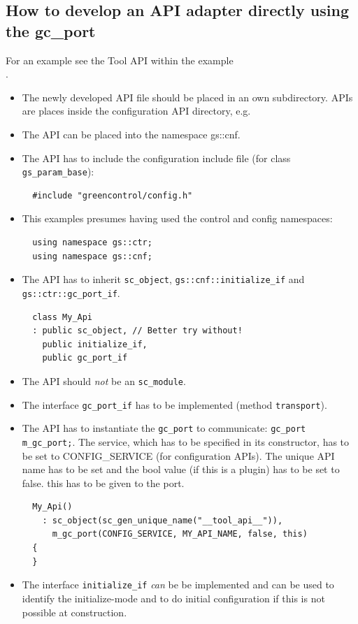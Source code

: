 \subsection{How to develop an API adapter directly using the gc\_port}
For an example see the Tool API within the \GreenControl example \\
.

\begin{itemize}
	\item The newly developed API file should be placed in an own subdirectory. \GreenConfig APIs are places inside the configuration API directory, e.g. 
	\item The API can be placed into the namespace {\sffamily gs::cnf}.
	\item The API has to include the configuration include file (for class \lstinline|gs_param_base|):
\begin{lstlisting}
  #include "greencontrol/config.h"
\end{lstlisting}

    \item This examples presumes having used the control and config namespaces:
\begin{lstlisting}
  using namespace gs::ctr;
  using namespace gs::cnf;
\end{lstlisting}

	\item The API has to inherit \lstinline|sc_object|, \lstinline|gs::cnf::initialize_if| and \mbox{\lstinline|gs::ctr::gc_port_if|.}
\begin{lstlisting}
  class My_Api
  : public sc_object, // Better try without!
    public initialize_if,
    public gc_port_if
\end{lstlisting}

	\item The API should {\em not} be an \lstinline|sc_module|.

	\item The interface \lstinline|gc_port_if| has to be implemented (method \lstinline|transport|).

	\item The API has to instantiate the \lstinline|gc_port| to communicate: \mbox{\lstinline|gc_port m_gc_port;|.} The service, which has to be specified in its constructor, has to be set to {\sffamily CONFIG\_SERVICE} (for configuration APIs). The unique API name has to be set and the bool value (if this is a plugin) has to be set to {\sffamily false}. {\sffamily this} has to be given to the port.
\begin{lstlisting}
  My_Api()
    : sc_object(sc_gen_unique_name("__tool_api__")),
      m_gc_port(CONFIG_SERVICE, MY_API_NAME, false, this)
  {
  }
\end{lstlisting}

	\item The interface \lstinline|initialize_if| \emph{can} be be implemented and can be used to identify the initialize-mode and to do initial configuration if this is not possible at construction.

\end{itemize}


